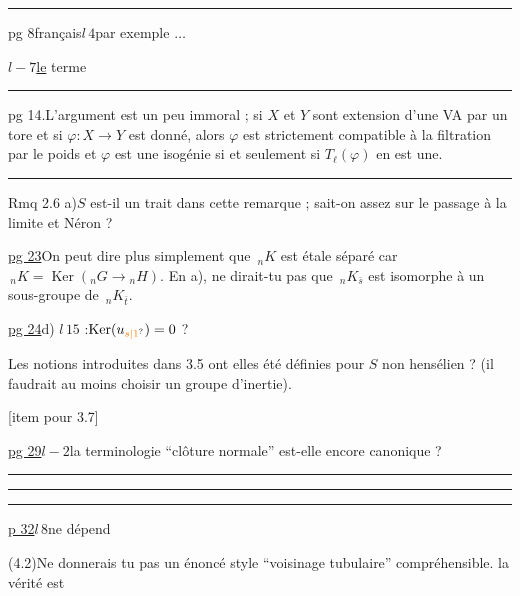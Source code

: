 \hrule

pg 8\qquad français\quad $l\,4$\qquad par exemple  $\ldots$

$l-7$\quad \uline{le} terme

\hrule

pg 14.\qquad L'argument est un peu immoral ; si $X$ et $Y$ sont extension d'une VA par un tore et si $\varphi:X\longrightarrow Y$ est donné, alors $\varphi$ est strictement compatible à la filtration par le poids et $\varphi$ est une isogénie si et seulement si $T_\ell(\varphi)$ en est une.

\hrule

\quad Rmq 2.6 a)\qquad $S$ est-il un trait dans cette remarque ; sait-on assez sur le passage à la limite et Néron ?


\quad \uline{pg 23}\qquad On peut dire plus simplement que $\,{}_nK$ est étale séparé car $\,{}_nK=\operatorname{Ker}({}_nG\longrightarrow{}_nH)$. En a), ne dirait-tu pas que $\,{}_nK_{\bar s}$ est isomorphe à un sous-groupe de $\,{}_nK_{\bar t}$.

\uline{pg 24}\quad d) $l\,15$ :\quad {}$\operatorname{Ker}(u_{\unsure{s|1}})=0$ ?

\quad Les notions introduites dans 3.5 ont elles été définies pour $S$ non hensélien ? (il faudrait au moins choisir un groupe d'inertie).

[item pour 3.7]

\uline{pg 29}\quad $l-2$\quad la terminologie ``clôture normale'' est-elle encore canonique ?

\hrule\smallskip\hrule\smallskip\hrule

\quad \uline{p 32}\quad $l\,8$\qquad ne dépend 

\quad (4.2)\qquad Ne donnerais tu pas un énoncé style ``voisinage tubulaire'' compréhensible. la vérité est

